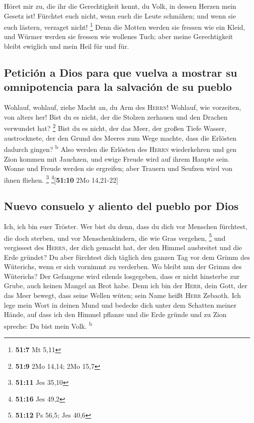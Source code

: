  Höret mir zu, die ihr die Gerechtigkeit kennt, du Volk,
in dessen Herzen mein Gesetz ist! Fürchtet euch nicht, wenn euch die
Leute schmähen; und wenn sie euch lästern, verzaget nicht! \footnote{\textbf{51:7}
  Mt 5,11}  Denn die Motten werden sie fressen wie ein
Kleid, und Würmer werden sie fressen wie wollenes Tuch; aber meine
Gerechtigkeit bleibt ewiglich und mein Heil für und für.

\hypertarget{peticiuxf3n-a-dios-para-que-vuelva-a-mostrar-su-omnipotencia-para-la-salvaciuxf3n-de-su-pueblo}{%
\subsection{Petición a Dios para que vuelva a mostrar su omnipotencia
para la salvación de su
pueblo}\label{peticiuxf3n-a-dios-para-que-vuelva-a-mostrar-su-omnipotencia-para-la-salvaciuxf3n-de-su-pueblo}}

 Wohlauf, wohlauf, ziehe Macht an, du Arm des
\textsc{Herrn}! Wohlauf, wie vorzeiten, von alters her! Bist du es
nicht, der die Stolzen zerhauen und den Drachen verwundet hat?
\footnote{\textbf{51:9} 2Mo 14,14; 2Mo 15,7}  Bist du es
nicht, der das Meer, der großen Tiefe Wasser, austrocknete, der den
Grund des Meeres zum Wege machte, dass die Erlösten dadurch gingen?
\textsuperscript{b}  Also werden die Erlösten des
\textsc{Herrn} wiederkehren und gen Zion kommen mit Jauchzen, und ewige
Freude wird auf ihrem Haupte sein. Wonne und Freude werden sie
ergreifen; aber Trauern und Seufzen wird von ihnen fliehen. \footnote{\textbf{51:11}
  Jes 35,10} \footnote{\textbf{51:16} Jes 49,2}{[}\textbf{51:10} 2Mo
14,21-22{]}

\hypertarget{nuevo-consuelo-y-aliento-del-pueblo-por-dios}{%
\subsection{Nuevo consuelo y aliento del pueblo por
Dios}\label{nuevo-consuelo-y-aliento-del-pueblo-por-dios}}

 Ich, ich bin euer Tröster. Wer bist du denn, dass du
dich vor Menschen fürchtest, die doch sterben, und vor Menschenkindern,
die wie Gras vergehen, \footnote{\textbf{51:12} Ps 56,5; Jes 40,6}
 und vergissest des \textsc{Herrn}, der dich gemacht hat,
der den Himmel ausbreitet und die Erde gründet? Du aber fürchtest dich
täglich den ganzen Tag vor dem Grimm des Wüterichs, wenn er sich
vornimmt zu verderben. Wo bleibt nun der Grimm des Wüterichs?
 Der Gefangene wird eilends losgegeben, dass er nicht
hinsterbe zur Grube, auch keinen Mangel an Brot habe. 
Denn ich bin der \textsc{Herr}, dein Gott, der das Meer bewegt, dass
seine Wellen wüten; sein Name heißt \textsc{Herr} Zebaoth.
 Ich lege mein Wort in deinen Mund und bedecke dich unter
dem Schatten meiner Hände, auf dass ich den Himmel pflanze und die Erde
gründe und zu Zion spreche: Du bist mein Volk. \textsuperscript{b}

